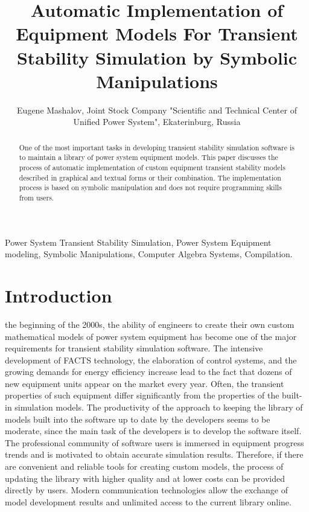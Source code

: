 \documentclass[lettersize,journal]{IEEEtran}
\begin{document}
\title{Automatic Implementation of Equipment Models For Transient Stability Simulation by Symbolic Manipulations}

\author {Eugene Mashalov, Joint Stock Company "Scientific and Technical Center of Unified Power System", Ekaterinburg, Russia}




\maketitle

\begin{abstract}
One of the most important tasks in developing transient stability simulation software is to maintain a library of power system equipment models. 
This paper discusses the process of automatic implementation of custom equipment transient stability models described in graphical and textual forms or their combination. 
The implementation process is based on symbolic manipulation and does not require programming skills from users.
\end{abstract}

\begin{IEEEkeywords}
Power System Transient Stability Simulation, Power System Equipment modeling, Symbolic Manipulations, Computer Algebra Systems, Compilation.
\end{IEEEkeywords}

\section{Introduction}
 the beginning of the 2000s, the ability of engineers to create their own custom mathematical models of power system equipment 
has become one of the major requirements for transient stability simulation software. The intensive development of FACTS technology, 
the elaboration of control systems, and the growing demands for energy efficiency increase lead to the fact that dozens 
of new equipment units appear on the market every year. Often, the transient properties of such equipment differ significantly from the properties of 
the built-in simulation models. The productivity of the approach to keeping the library of models built into the software up to date by the developers 
seems to be moderate, since the main task of the developers is to develop the software itself. 
The professional community of software users is immersed in equipment progress trends and is motivated to obtain accurate simulation results. 
Therefore, if there are convenient and reliable tools for creating custom models, the process of updating the library with higher quality and at lower costs 
can be provided directly by users. Modern communication technologies allow the exchange of model development results and unlimited access to the current library online.
\end{document}
